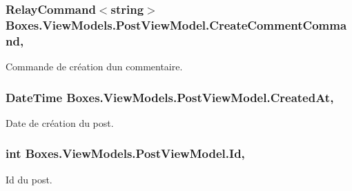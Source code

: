 \subsubsection[{\texorpdfstring{Create\+Comment\+Command}{CreateCommentCommand}}]{\setlength{\rightskip}{0pt plus 5cm}Relay\+Command$<$string$>$ Boxes.\+View\+Models.\+Post\+View\+Model.\+Create\+Comment\+Command\hspace{0.3cm}{\ttfamily [get]}, {}}\hypertarget{class_boxes_1_1_view_models_1_1_post_view_model_ac3f6e6b6da43952f994401063ff450e1}{}\label{class_boxes_1_1_view_models_1_1_post_view_model_ac3f6e6b6da43952f994401063ff450e1}


Commande de création d\textquotesingle{}un commentaire. 

\subsubsection[{\texorpdfstring{Created\+At}{CreatedAt}}]{\setlength{\rightskip}{0pt plus 5cm}Date\+Time Boxes.\+View\+Models.\+Post\+View\+Model.\+Created\+At\hspace{0.3cm}{\ttfamily [get]}, {\ttfamily [set]}}\hypertarget{class_boxes_1_1_view_models_1_1_post_view_model_a8209232998d5fc35e9f1ec3198efd0d4}{}\label{class_boxes_1_1_view_models_1_1_post_view_model_a8209232998d5fc35e9f1ec3198efd0d4}


Date de création du post. 

\subsubsection[{\texorpdfstring{Id}{Id}}]{\setlength{\rightskip}{0pt plus 5cm}int Boxes.\+View\+Models.\+Post\+View\+Model.\+Id\hspace{0.3cm}{\ttfamily [get]}, {\ttfamily [set]}}\hypertarget{class_boxes_1_1_view_models_1_1_post_view_model_a7f2adb3a5ef1d304b927373802ad0093}{}\label{class_boxes_1_1_view_models_1_1_post_view_model_a7f2adb3a5ef1d304b927373802ad0093}


Id du post. 

